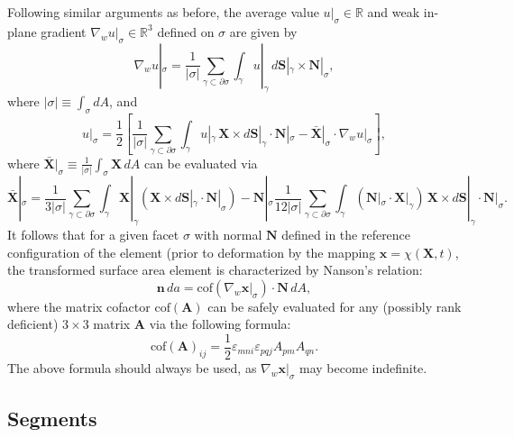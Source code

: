 \documentclass[10pt,a4paper]{article}
\begin{document}
Following similar arguments as before, the average value $u |_{\sigma} \in \mathbb{R}$ and weak in-plane gradient $\nabla_w u |_{\sigma} \in \mathbb{R}^3$ defined on $\sigma$ are given by
\begin{equation}
  \nabla_{w} u |_{\sigma} = \frac{1}{|\sigma|} \sum_{\gamma \subset \partial \sigma} \int_{\gamma} u |_{\gamma} \, d\mathbf{S} |_{\gamma} \times \mathbf{N} |_{\sigma},
\end{equation}
where $|\sigma| \equiv \int_{\sigma} dA$, and
\begin{equation}
	u |_{\sigma} = \frac{1}{2} \left[ \frac{1}{| \sigma |} \sum_{\gamma \subset \partial \sigma} \int_{\gamma} u |_{\gamma} \, \mathbf{X} \times d\mathbf{S} |_{\gamma} \cdot \mathbf{N} |_{\sigma} - \bar{\mathbf{X}} |_{\sigma} \cdot \nabla_{w} u |_{\sigma} \right] ,
\end{equation}
where $\bar{\mathbf{X}} |_{\sigma} \equiv \frac{1}{|\sigma|} \int_{\sigma} \mathbf{X} \, dA$ can be evaluated via
\begin{equation}
	\bar{\mathbf{X}} |_{\sigma} = \frac{1}{3 | \sigma |} \sum_{\gamma \subset \partial \sigma} \int_{\gamma} \mathbf{X} |_{\gamma} ( \mathbf{X} \times d\mathbf{S} |_{\gamma} \cdot \mathbf{N} |_{\sigma}) - \mathbf{N} |_{\sigma} \frac{1}{12 | \sigma |} \sum_{\gamma \subset \partial \sigma} \int_{\gamma} (\mathbf{N} |_{\sigma} \cdot \mathbf{X} |_{\gamma}) \, \mathbf{X} \times d\mathbf{S} |_{\gamma} \cdot \mathbf{N} |_{\sigma}.
\end{equation}
It follows that for a given facet $\sigma$ with normal $\mathbf{N}$ defined in the reference configuration of the element (prior to deformation by the mapping $\mathbf{x} = \chi (\mathbf{X},t)$, the transformed surface area element is characterized by Nanson's relation:
\begin{equation}
	\mathbf{n} \, da = \text{cof} \left( \nabla_w \mathbf{x} |_{\sigma} \right) \cdot \mathbf{N} \, dA,
\end{equation}
where the matrix cofactor $\text{cof} \left( \mathbf{A} \right)$ can be safely evaluated for any (possibly rank deficient) $3\times3$ matrix $\mathbf{A}$ via the following formula:
\begin{equation}
	\text{cof} \left( \mathbf{A} \right)_{ij} = \frac{1}{2} \varepsilon_{mni} \varepsilon_{pqj} A_{pm} A_{qn} .
\end{equation}
The above formula should always be used, as $\nabla_w \mathbf{x} |_{\sigma}$ may become indefinite.

\subsection{Segments}
\end{document}
